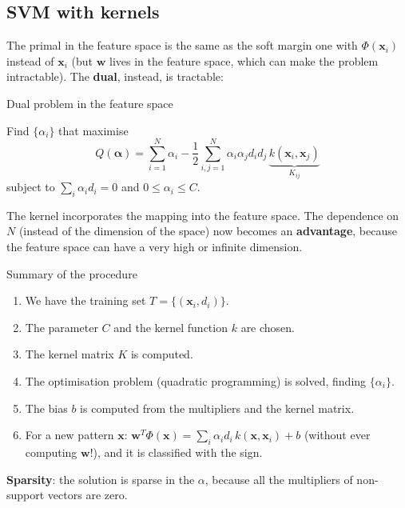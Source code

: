 \subsection{SVM with kernels}\label{svm-con-kernel}

The primal in the feature space is the same as the soft margin one with
\(\Phi(\mathbf{x}_i)\) instead of \(\mathbf{x}_i\) (but \(\mathbf{w}\)
lives in the feature space, which can make the problem intractable).
The \textbf{dual}, instead, is tractable:

\begin{boxdefinition}{Dual problem in the feature space}

Find \(\{\alpha_i\}\) that maximise \[
Q(\boldsymbol{\alpha}) = \sum_{i=1}^{N}\alpha_i - \frac{1}{2}\sum_{i,j=1}^{N}\alpha_i\alpha_j d_i d_j\,\underbrace{k(\mathbf{x}_i, \mathbf{x}_j)}_{K_{ij}}
\] subject to \(\sum_i\alpha_i d_i = 0\) and \(0 \le \alpha_i \le C\).

\end{boxdefinition}

The kernel incorporates the mapping into the feature space. The
dependence on \(N\) (instead of the dimension of the space) now becomes
an \textbf{advantage}, because the feature space can have a very high
or infinite dimension.

\begin{boxabstract}{Summary of the procedure}

\begin{enumerate}
\def\labelenumi{\arabic{enumi}.}
\tightlist
\item
  We have the training set \(T = \{(\mathbf{x}_i, d_i)\}\).
\item
  The parameter \(C\) and the kernel function \(k\) are chosen.
\item
  The kernel matrix \(K\) is computed.
\item
  The optimisation problem (quadratic programming) is solved, finding
  \(\{\alpha_i\}\).
\item
  The bias \(b\) is computed from the multipliers and the kernel
  matrix.
\item
  For a new pattern \(\mathbf{x}\):
  \(\mathbf{w}^T\Phi(\mathbf{x}) = \sum_i\alpha_i d_i\,k(\mathbf{x}, \mathbf{x}_i) + b\)
  (without ever computing \(\mathbf{w}\)!), and it is classified with
  the sign.
\end{enumerate}

\textbf{Sparsity}: the solution is sparse in the \(\alpha\), because
all the multipliers of non-support vectors are zero.

\end{boxabstract}

